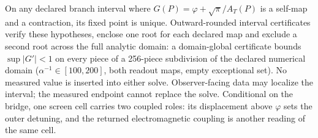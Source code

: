 On any declared branch interval where \(G(P)=\varphi+\sqrt\pi/A_T(P)\) is a
self-map and a contraction, its fixed point is unique. Outward-rounded
interval certificates verify these hypotheses, enclose one root for each
declared map and exclude a second root across the full analytic domain: a
domain-global certificate bounds \(\sup|G'|<1\) on every piece of a 256-piece
subdivision of the declared numerical domain
(\(\alpha^{-1}\in[100,200]\), both readout maps, empty exceptional set). No
measured value is inserted into either solve. Observer-facing data may
localize the interval; the measured endpoint cannot replace the solve.
Conditional on the bridge, one screen cell carries two coupled roles: its
displacement above \(\varphi\) sets the outer detuning, and the returned
electromagnetic coupling is another reading of the same cell.

